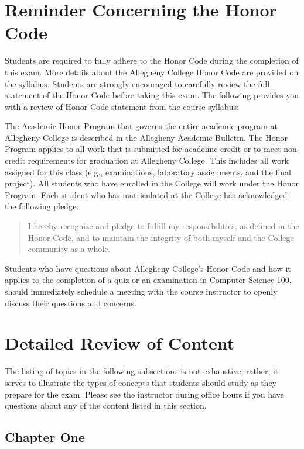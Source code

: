 \documentclass[11pt]{article}
\begin{document}
\section*{Reminder Concerning the Honor Code}

\noindent Students are required to fully adhere to the Honor Code during the
completion of this exam. More details about the Allegheny College Honor Code are
provided on the syllabus. Students are strongly encouraged to carefully review
the full statement of the Honor Code before taking this exam. The following
provides you with a review of Honor Code statement from the course syllabus:

The Academic Honor Program that governs the entire academic program at Allegheny
College is described in the Allegheny Academic Bulletin. The Honor Program
applies to all work that is submitted for academic credit or to meet non-credit
requirements for graduation at Allegheny College. This includes all work
assigned for this class (e.g., examinations, laboratory assignments, and the
final project). All students who have enrolled in the College will work under
the Honor Program. Each student who has matriculated at the College has
acknowledged the following pledge:

\begin{quote}
%
  I hereby recognize and pledge to fulfill my responsibilities, as defined in
  the Honor Code, and to maintain the integrity of both myself and the College
  community as a whole.
%
\end{quote}

Students who have questions about Allegheny College's Honor Code and how it
applies to the completion of a quiz or an examination in Computer Science 100,
should immediately schedule a meeting with the course instructor to openly
discuss their questions and concerns.

\section*{Detailed Review of Content}

The listing of topics in the following subsections is not exhaustive; rather, it serves to illustrate the types of
concepts that students should study as they prepare for the exam. Please see the instructor during office hours if you
have questions about any of the content listed in this section.

\subsection*{Chapter One}
\end{document}
